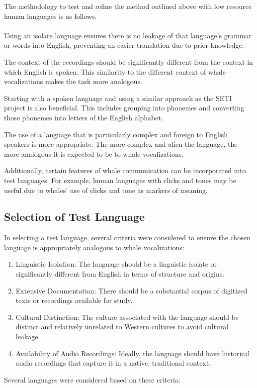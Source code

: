 \documentclass{article}
\begin{document}
The methodology to test and refine the method outlined above with low resource human languages is as follows.\\ \\
Using an isolate language ensures there is no leakage of that language's grammar or words into English, preventing an easier translation due to prior knowledge.

The context of the recordings should be significantly different from the context in which English is spoken. This similarity to the different context of whale vocalizations makes the task more analogous.

Starting with a spoken language and using a similar approach as the SETI project is also beneficial. This includes grouping into phonemes and converting those phonemes into letters of the English alphabet.

The use of a language that is particularly complex and foreign to English speakers is more appropriate. The more complex and alien the language, the more analogous it is expected to be to whale vocalizations.

Additionally, certain features of whale communication can be incorporated into test languages. For example, human languages with clicks and tones may be useful due to whales' use of clicks and tone as markers of meaning.

\subsection{Selection of Test Language}
In selecting a test language, several criteria were considered to ensure the chosen language is appropriately analogous to whale vocalizations:
\begin{enumerate}
    \item Linguistic Isolation: The language should be a linguistic isolate or significantly different from English in terms of structure and origins.
    \item Extensive Documentation: There should be a substantial corpus of digitized texts or recordings available for study.
    \item Cultural Distinction: The culture associated with the language should be distinct and relatively unrelated to Western cultures to avoid cultural leakage.
    \item Availability of Audio Recordings: Ideally, the language should have historical audio recordings that capture it in a native, traditional context.
\end{enumerate}
Several languages were considered based on these criteria:
\end{document}
